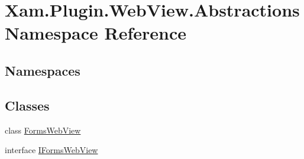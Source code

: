 \hypertarget{namespace_xam_1_1_plugin_1_1_web_view_1_1_abstractions}{}\section{Xam.\+Plugin.\+Web\+View.\+Abstractions Namespace Reference}
\label{namespace_xam_1_1_plugin_1_1_web_view_1_1_abstractions}
\subsection*{Namespaces}
\begin{DoxyCompactItemize}
\end{DoxyCompactItemize}
\subsection*{Classes}
\begin{DoxyCompactItemize}
\item 
class \hyperlink{class_xam_1_1_plugin_1_1_web_view_1_1_abstractions_1_1_forms_web_view}{Forms\+Web\+View}
\item 
interface \hyperlink{interface_xam_1_1_plugin_1_1_web_view_1_1_abstractions_1_1_i_forms_web_view}{I\+Forms\+Web\+View}
\end{DoxyCompactItemize}
